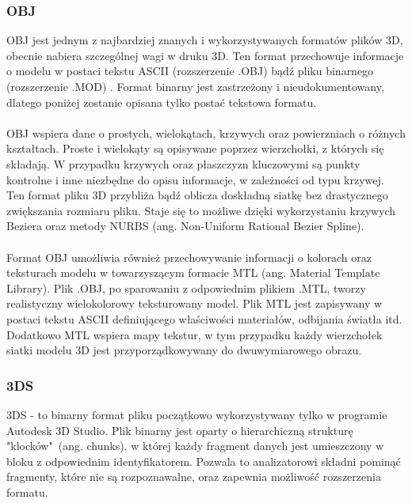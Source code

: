\subsubsection{OBJ}
OBJ jest jednym z najbardziej znanych i wykorzystywanych formatów plików 3D, obecnie nabiera szczególnej wagi w druku 3D. Ten format przechowuje informacje o modelu w postaci tekstu ASCII (rozszerzenie .OBJ) bądź pliku binarnego (rozszerzenie .MOD) \cite{objinfo}.
Format binarny jest zastrzeżony i nieudokumentowany, dlatego poniżej zostanie opisana tylko postać tekstowa formatu. \paragraph{}
OBJ wspiera dane o prostych, wielokątach, krzywych oraz powierzniach o różnych kształtach. Proste i wielokąty są opisywane poprzez wierzchołki, z których się składają. W przypadku krzywych oraz płaszczyzn kluczowymi są punkty kontrolne i inne niezbędne do opisu informacje, w zależności od typu krzywej. Ten format pliku 3D przybliża bądź oblicza doskładną siatkę bez drastycznego zwiększania rozmiaru pliku. Staje się to możliwe dzięki wykorzystaniu krzywych Beziera oraz metody NURBS (ang. Non-Uniform Rational Bezier Spline). \paragraph{}
Format OBJ umożliwia również przechowywanie informacji o kolorach oraz teksturach modelu w towarzyszącym formacie MTL (ang. Material Template Library). Plik .OBJ, po sparowaniu z odpowiednim plikiem .MTL, tworzy realistyczny wielokolorowy teksturowany model. Plik MTL jest zapisywany w postaci tekstu ASCII definiującego właściwości materiałów, odbijania światła itd. Dodatkowo MTL wspiera mapy tekstur, w tym przypadku każdy wierzchołek siatki modelu 3D jest przyporządkowywany do dwuwymiarowego obrazu. 


\subsubsection{3DS}
3DS - to binarny format pliku początkowo wykorzystywany tylko w programie Autodesk 3D Studio. Plik binarny jest oparty o hierarchiczną strukturę "klocków"\ (ang. chunks), w której każdy fragment danych jest umieszczony w bloku z odpowiednim identyfikatorem. Pozwala to analizatorowi składni pominąć fragmenty, które nie są rozpoznawalne, oraz zapewnia możliwość rozszerzenia formatu. %

